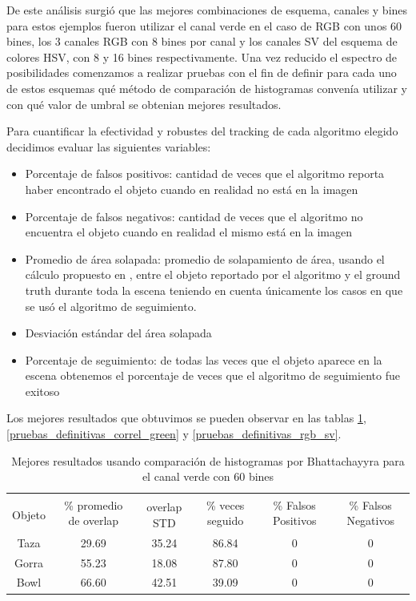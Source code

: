 De este análisis surgió que las mejores combinaciones de esquema, canales y bines para estos ejemplos fueron utilizar el canal verde en el caso de RGB con unos 60 bines, los 3 canales RGB con 8 bines por canal  y los canales SV del esquema de colores HSV, con 8 y 16 bines respectivamente. Una vez reducido el espectro de posibilidades comenzamos a realizar pruebas con el fin de definir para cada uno de estos esquemas qué método de comparación de histogramas convenía utilizar y con qué valor de umbral se obtenian mejores resultados.

Para cuantificar la efectividad y robustes del tracking de cada algoritmo elegido decidimos evaluar las siguientes variables:
\begin{itemize}
	\item Porcentaje de falsos positivos: cantidad de veces que el algoritmo reporta haber encontrado el objeto cuando en realidad no está en la imagen
	\item Porcentaje de falsos negativos: cantidad de veces que el algoritmo no encuentra el objeto cuando en realidad el mismo está en la imagen
	\item Promedio de área solapada: promedio de solapamiento de área, usando el cálculo propuesto en \cite{everinghampascal}, entre el objeto reportado por el algoritmo y el ground truth durante toda la escena teniendo en cuenta únicamente los casos en que se usó el algoritmo de seguimiento.
	\item Desviación estándar del área solapada
	\item Porcentaje de seguimiento: de todas las veces que el objeto aparece en la escena obtenemos el porcentaje de veces que el algoritmo de seguimiento fue exitoso
\end{itemize}

Los mejores resultados que obtuvimos se pueden observar en las tablas \ref{pruebas_definitivas_bhatta_green}, \ref{pruebas_definitivas_correl_green} y \ref{pruebas_definitivas_rgb_sv}.

\begin{table}[h]
	\begin{tabular}{|c|c|c|c|c|c|}
	    \hline
	    & \multirow{2}{2.4cm}{\% promedio de overlap} & & \multirow{2}{2cm}{\% veces seguido} & \multirow{2}{1.6cm}{\% Falsos Positivos} & \multirow{2}{1.6cm}{\% Falsos Negativos}\\
		Objeto & & overlap STD & & &\\
	    \hline
	    Taza   & 29.69      & 35.24       & 86.84             & 0                & 0\\
	    \hline
	    Gorra  & 55.23      & 18.08       & 87.80             & 0                & 0\\
	    \hline
	    Bowl   & 66.60      & 42.51       & 39.09             & 0                & 0\\
	    \hline
    \end{tabular}
	\caption{Mejores resultados usando comparación de histogramas por Bhattachayyra para el canal verde con 60 bines}
	\label{pruebas_definitivas_bhatta_green}
\end{table}

